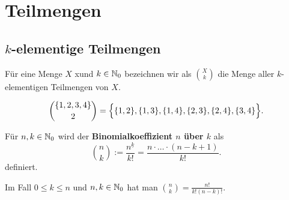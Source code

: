 \section{Teilmengen} 

\subsection{$k$-elementige Teilmengen} 

\begin{defn}
Für eine Menge $X$ xund $k \in \mathbb{N}_0$ bezeichnen wir als $\binom{X}{k}$ die Menge aller $k$-elementigen Teilmengen von $X$. 
\end{defn}

\begin{bsp}
	\[
	\binom{\{1,2,3,4\}}{2} = \Bigl\{ \{1,2\},\{1,3\}, \{1,4\}, \{2,3\}, \{2,4\} ,\{3,4\} \Bigr\}.
	\]
\end{bsp} 


\begin{defn}
	Für $n,k \in \mathbb{N}_0$ wird der \textbf{Binomialkoeffizient  $n$ über $k$} als 
	\[
		\binom{n}{k}:= \frac{n^{\underline{k}}}{k!}  = \frac{n \cdot \ldots \cdot (n-k+1)}{k!}.
	\]
	definiert. 
\end{defn} 

\begin{bem}
	Im Fall $0 \le k \le n$ und $n,k \in \mathbb{N}_0$ hat man $\binom{n}{k} = \frac{n!}{k! (n-k)!}$. 
\end{bem} 


